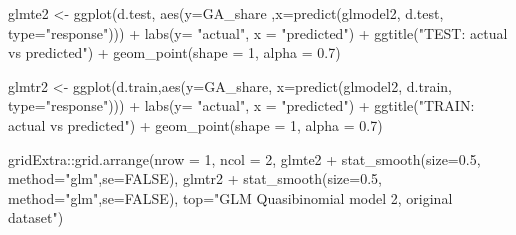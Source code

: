 \documentclass[
]{article}
\newenvironment{Shaded}{\begin{snugshade}}{\end{snugshade}}
\newcommand{\AttributeTok}[1]{\textcolor[rgb]{0.77,0.63,0.00}{#1}}
\newcommand{\ConstantTok}[1]{\textcolor[rgb]{0.00,0.00,0.00}{#1}}
\newcommand{\DecValTok}[1]{\textcolor[rgb]{0.00,0.00,0.81}{#1}}
\newcommand{\FloatTok}[1]{\textcolor[rgb]{0.00,0.00,0.81}{#1}}
\newcommand{\FunctionTok}[1]{\textcolor[rgb]{0.00,0.00,0.00}{#1}}
\newcommand{\NormalTok}[1]{#1}
\newcommand{\OtherTok}[1]{\textcolor[rgb]{0.56,0.35,0.01}{#1}}
\newcommand{\SpecialCharTok}[1]{\textcolor[rgb]{0.00,0.00,0.00}{#1}}
\newcommand{\StringTok}[1]{\textcolor[rgb]{0.31,0.60,0.02}{#1}}
\begin{document}
\begin{Shaded}
\begin{Highlighting}[]
\NormalTok{glmte2 }\OtherTok{\textless{}{-}} \FunctionTok{ggplot}\NormalTok{(d.test, }\FunctionTok{aes}\NormalTok{(}\AttributeTok{y=}\NormalTok{GA\_share ,}\AttributeTok{x=}\FunctionTok{predict}\NormalTok{(glmodel2, d.test, }\AttributeTok{type=}\StringTok{"response"}\NormalTok{))) }\SpecialCharTok{+}
  \FunctionTok{labs}\NormalTok{(}\AttributeTok{y=} \StringTok{"actual"}\NormalTok{, }\AttributeTok{x =} \StringTok{"predicted"}\NormalTok{) }\SpecialCharTok{+} \FunctionTok{ggtitle}\NormalTok{(}\StringTok{"TEST: actual vs predicted"}\NormalTok{) }\SpecialCharTok{+} 
  \FunctionTok{geom\_point}\NormalTok{(}\AttributeTok{shape =} \DecValTok{1}\NormalTok{, }\AttributeTok{alpha =} \FloatTok{0.7}\NormalTok{)}

\NormalTok{glmtr2 }\OtherTok{\textless{}{-}} \FunctionTok{ggplot}\NormalTok{(d.train,}\FunctionTok{aes}\NormalTok{(}\AttributeTok{y=}\NormalTok{GA\_share, }\AttributeTok{x=}\FunctionTok{predict}\NormalTok{(glmodel2, d.train, }\AttributeTok{type=}\StringTok{"response"}\NormalTok{))) }\SpecialCharTok{+}
  \FunctionTok{labs}\NormalTok{(}\AttributeTok{y=} \StringTok{"actual"}\NormalTok{, }\AttributeTok{x =} \StringTok{"predicted"}\NormalTok{) }\SpecialCharTok{+} \FunctionTok{ggtitle}\NormalTok{(}\StringTok{"TRAIN: actual vs predicted"}\NormalTok{) }\SpecialCharTok{+} 
  \FunctionTok{geom\_point}\NormalTok{(}\AttributeTok{shape =} \DecValTok{1}\NormalTok{, }\AttributeTok{alpha =} \FloatTok{0.7}\NormalTok{)}

\NormalTok{gridExtra}\SpecialCharTok{::}\FunctionTok{grid.arrange}\NormalTok{(}\AttributeTok{nrow =} \DecValTok{1}\NormalTok{, }\AttributeTok{ncol =} \DecValTok{2}\NormalTok{, }
\NormalTok{                        glmte2 }\SpecialCharTok{+} \FunctionTok{stat\_smooth}\NormalTok{(}\AttributeTok{size=}\FloatTok{0.5}\NormalTok{, }\AttributeTok{method=}\StringTok{"glm"}\NormalTok{,}\AttributeTok{se=}\ConstantTok{FALSE}\NormalTok{),}
\NormalTok{                        glmtr2 }\SpecialCharTok{+} \FunctionTok{stat\_smooth}\NormalTok{(}\AttributeTok{size=}\FloatTok{0.5}\NormalTok{, }\AttributeTok{method=}\StringTok{"glm"}\NormalTok{,}\AttributeTok{se=}\ConstantTok{FALSE}\NormalTok{),}
                        \AttributeTok{top=}\StringTok{"GLM Quasibinomial model 2, original dataset"}\NormalTok{)}
\end{Highlighting}
\end{Shaded}
\end{document}
